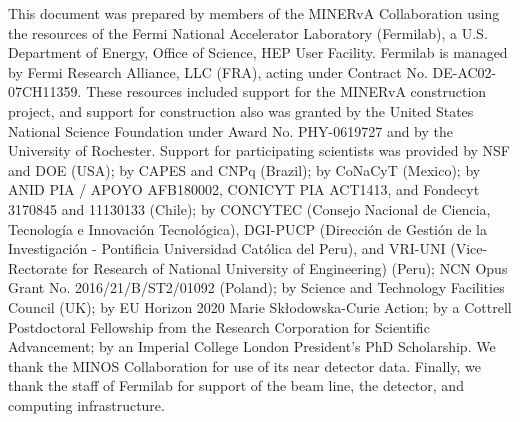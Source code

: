 \documentclass[aps,preprint,showpacs,superscriptaddress,letterpaper,showkeys,superscriptaddress,nofootinbib,floatfix]{revtex4-1}
\newcommand{\paperComment}[1]{{\noindent \bf\color{red}\small [Committee: #1]}}
\renewcommand{\paperComment}[1]{}
\begin{document}
\begin{acknowledgements}

\paperComment{pulled version dated March 2022, v15, from DocDB.  https://minerva-docdb.fnal.gov/cgi-bin/sso/ShowDocument?docid=13929&version=15  Unclear how it is actually different...}

This document was prepared by members of the MINERvA Collaboration using the resources of the Fermi National Accelerator Laboratory (Fermilab), a U.S. Department of Energy, Office of Science, HEP User Facility. Fermilab is managed by Fermi Research Alliance, LLC (FRA), acting under Contract No. DE-AC02-07CH11359.
These resources included support for the MINERvA construction project, and support
for construction also
was granted by the United States National Science Foundation under
Award No. PHY-0619727 and by the University of Rochester. Support for
participating scientists was provided by NSF and DOE (USA); by CAPES
and CNPq (Brazil); by CoNaCyT (Mexico); by ANID PIA / APOYO AFB180002, CONICYT PIA ACT1413, and Fondecyt 3170845 and 11130133 (Chile); 
by CONCYTEC (Consejo Nacional de Ciencia, Tecnolog\'ia e Innovaci\'on Tecnol\'ogica), DGI-PUCP (Direcci\'on de Gesti\'on de la Investigaci\'on  - Pontificia Universidad Cat\'olica del Peru), and VRI-UNI (Vice-Rectorate for Research of National University of Engineering) (Peru); NCN Opus Grant No. 2016/21/B/ST2/01092 (Poland); by Science and Technology Facilities Council (UK); by EU Horizon 2020 Marie Skłodowska-Curie Action; by a Cottrell Postdoctoral Fellowship from the Research Corporation for Scientific Advancement; by an Imperial College London President's PhD Scholarship.  We thank the MINOS Collaboration for use of its near detector data. Finally, we thank the staff of
Fermilab for support of the beam line, the detector, and computing infrastructure.




\end{acknowledgements}
\end{document}
